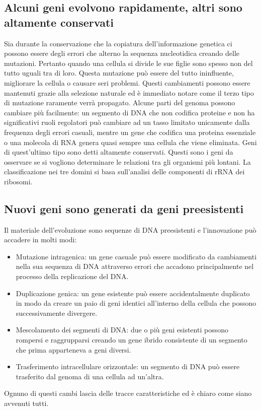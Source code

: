 \subsection{Alcuni geni evolvono rapidamente, altri sono altamente conservati}
Sia durante la conservazione che la copiatura dell'informazione genetica ci possono essere degli errori che alterno la sequenza nucleotidica creando delle mutazioni. Pertanto quando una
cellula si divide le sue figlie sono spesso non del tutto uguali tra di loro. Questa mutazione pu\`o essere del tutto ininfluente, migliorare la cellula o causare seri problemi. 
Questi cambiamenti possono essere mantenuti grazie alla selezione naturale ed \`e immediato notare come il terzo tipo di mutazione raramente verr\`a propagato. Alcune parti del genoma
possono cambiare pi\`u facilmente: un segmento di DNA che non codifica proteine e non ha significativi ruoli regolatori pu\`o cambiare ad un tasso limitato unicamente dalla frequenza
degli errori casuali, mentre un gene che codifica una proteina essenziale o una molecola di RNA genera quasi sempre una cellula che viene eliminata. Geni di quest'ultimo tipo sono detti
altamente conservati. Questi sono i geni da osservare se si vogliono determinare le relazioni tra gli organismi pi\`u lontani. La classificazione nei tre domini si basa sull'analisi
delle componenti di rRNA dei ribosomi. 
\subsection{Nuovi geni sono generati da geni preesistenti}
Il materiale dell'evoluzione sono sequenze di DNA preesistenti e l'innovazione pu\`o accadere in molti modi:
\begin{itemize}
	\item Mutazione intragenica: un gene casuale pu\`o essere modificato da cambiamenti nella sua sequenza di DNA attraverso errori che accadono principalmente nel processo della
		replicazione del DNA.
	\item Duplicazione genica: un gene esistente pu\`o essere accidentalmente duplicato in modo da creare un paio di geni identici all'interno della cellula che possono 
		successivamente divergere. 
	\item Mescolamento dei segmenti di DNA: due o pi\`u geni esistenti possono rompersi e raggrupparsi creando un gene ibrido consistente di un segmento che prima apparteneva a 
		geni diversi.
	\item Trasferimento intracellulare orizzontale: un segmento di DNA pu\`o essere trasferito dal genoma di una cellula ad un'altra. 
\end{itemize}
Ognuno di questi cambi lascia delle tracce caratteristiche ed \`e chiaro come siano avvenuti tutti.
